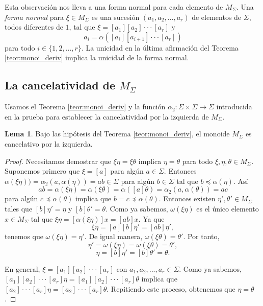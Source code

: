 \documentclass[12pt]{book}
\theoremstyle{definition}
\newtheorem{lema}{Lema}[section]
\begin{document}
Esta observación nos lleva a una forma normal para cada elemento de $M_\Sigma$. Una \textit{forma normal} para $\xi\in M_\Sigma$ es una sucesión $(a_1,a_2,...,a_r)$ de elementos de $\Sigma$, todos diferentes de $1$, tal que $\xi=[a_1][a_2]\cdot\cdot\cdot[a_r]$ y 
$$a_i=\alpha([a_i][a_{i+1}]\cdot\cdot\cdot[a_r])$$
para todo $i\in\{1,2,...,r\}$. La unicidad en la última afirmación del Teorema \ref{teor:monoi_deriv} implica la unicidad de la forma normal.


\subsection{La cancelatividad de $M_\Sigma$}

Usamos el Teorema \ref{teor:monoi_deriv} y la función $\alpha_2:\Sigma\times\Sigma\rightarrow\Sigma$ introducida en la prueba para establecer la cancelatividad por la izquierda de $M_\Sigma$.

\begin{lema}
Bajo las hipótesis del Teorema \ref{teor:monoi_deriv}, el monoide $M_\Sigma$ es cancelativo por la izquierda.
\label{lema:cancel}
\end{lema}

\begin{proof} Necesitamos demostrar que $\xi\eta=\xi\theta$ implica $\eta=\theta$ para todo $\xi,\eta,\theta\in M_\Sigma$. Suponemos primero que $\xi=[a]$ para algún $a\in\Sigma$. Entonces $\alpha(\xi\eta))=\alpha_2(a,\alpha(\eta))=ab\in\Sigma$ para algún $b\in\Sigma$ tal que $b\preceq \alpha(\eta)$. Así
$$ab=\alpha(\xi\eta)=\alpha(\xi\theta)=\alpha([a]\theta)=\alpha_2(a,\alpha(\theta))=ac$$
para algún $c\preceq\alpha(\theta)$ implica que $b=c\preceq\alpha(\theta)$. Entonces existen $\eta',\theta'\in M_\Sigma$ tales que $[b]\eta'=\eta$ y $[b]\theta'=\theta$. Como ya sabemos, $\omega(\xi\eta)$ es el único elemento $x\in M_\Sigma$ tal que $\xi\eta=[\alpha(\xi\eta)]x=[ab]x$. Ya que
$$\xi\eta=[a][b]\eta'=[ab]\eta',$$
tenemos que $\omega(\xi\eta) = \eta'$. De igual manera, $\omega(\xi\theta)=\theta'$. Por tanto,
$$\eta'=\omega(\xi\eta)=\omega(\xi\theta)=\theta',$$
$$\eta=[b]\eta'=[b]\theta'=\theta.$$

En general, $\xi=[a_1][a_2]\cdot\cdot\cdot[a_r]$ con $a_1,a_2,...,a_r\in\Sigma$. Como ya sabemos, $[a_1][a_2]\cdot\cdot\cdot[a_r]\eta=[a_1][a_2]\cdot\cdot\cdot[a_r]\theta$ implica que $[a_2]\cdot\cdot\cdot[a_r]\eta=[a_2]\cdot\cdot\cdot[a_r]\theta$. Repitiendo este proceso, obtenemos que $\eta=\theta$.
\end{proof}
\end{document}
